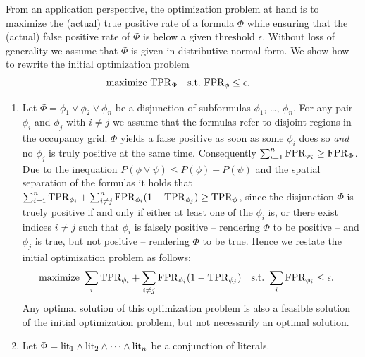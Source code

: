 From an application perspective, the optimization problem at hand is to maximize the (actual) true positive rate of a formula $\Phi$ while ensuring that the (actual) false positive rate of $\Phi$ is below a given threshold $\epsilon$. Without loss of generality we assume that $\Phi$ is given in distributive normal form. We show how
to rewrite the initial optimization problem
\begin{align*}
  \textrm{maximize} &\ \mathrm{TPR}_\Phi&
  \textrm{s.t.} &\ \mathrm{FPR}_\phi\leq \epsilon\text.
\end{align*}

\begin{enumerate}
\item Let $\Phi = \phi_1 \lor \phi_2 \lor \phi_n$ be a disjunction of
  subformulas $\phi_1$, \dots, $\phi_n$. For any pair $\phi_i$ and $\phi_j$ with $i\neq j$ we assume that the formulas refer to disjoint regions in the occupancy grid. 
  $\Phi$ yields a false positive as soon as some $\phi_i$ does so \emph{and} no $\phi_j$ is truly positive at the same time. Consequently $\sum_{i=1}^n \mathrm{FPR}_{\phi_i} \geq \mathrm{FPR}_{\Phi}$. Due to the inequation $P(\phi \lor \psi) \leq P(\phi) + P(\psi)$ and
  the spatial separation of the formulas it holds that $\sum_{i=1}^n\mathrm{TPR}_{\phi_i} + \sum_{i \neq j}^n \mathrm{FPR}_{\phi_i}(1-\mathrm{TPR}_{\phi_j})\geq \mathrm{TPR}_\phi$,
  since the disjunction $\Phi$ is truely positive if and only if either at least one of the $\phi_i$ is, or there exist indices $i\neq j$ such that $\phi_i$ is falsely positive -- rendering $\Phi$ to be positive -- and $\phi_j$ is true, but not positive -- rendering $\Phi$ to be true.
  Hence we restate the initial optimization problem as follows:
  \begin{align}
    \textrm{maximize} &\ \sum_{i} \mathrm{TPR}_{\phi_i}+\sum_{i\neq j}
    \mathrm{FPR}_{\phi_i}(1-\mathrm{TPR}_{\phi_j})& 
    \textrm{s.t.} &\ \sum_{i} \mathrm{FPR}_{\phi_i} \leq \epsilon\text.
    \label{eq:optimization2}
  \end{align}
  Any optimal solution of this optimization problem is also a
  feasible solution of the initial optimization problem, but not necessarily
  an optimal solution.
\item Let $\Phi = \mathrm{lit}_1 \land \mathrm{lit}_2 \land \dots \land \mathrm{lit}_n$
  be a conjunction of literals.


\end{enumerate}
